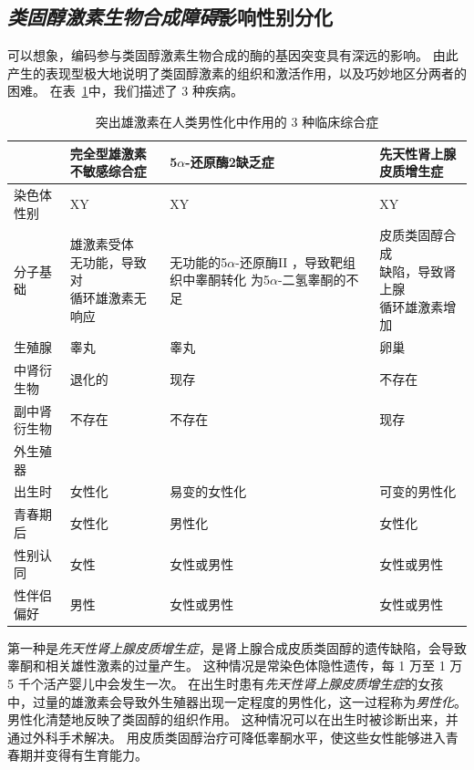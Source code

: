 \subsection{\textit{类固醇激素生物合成障碍}影响性别分化}

可以想象，编码参与类固醇激素生物合成的酶的基因突变具有深远的影响。
由此产生的表现型极大地说明了类固醇激素的组织和激活作用，以及巧妙地区分两者的困难。
在表~\ref{tab:51_1}中，我们描述了 3 种疾病。


\begin{table}[htbp]
	\caption{突出雄激素在人类男性化中作用的 3 种临床综合症} \label{tab:51_1} \centering
	\begin{tabular}{llll}
		\toprule
		 & 完全型雄激素不敏感综合症 & 5$\alpha$-还原酶2缺乏症 & 先天性肾上腺皮质增生症\\
		\midrule
		染色体性别 & XY & XY & XY \\
		分子基础 & \makecell[l]{雄激素受体\\无功能，导致对\\循环雄激素无响应} & \makecell[l]{无功能的5$\alpha$-还原酶II\\，导致靶组织中睾酮转化\\为5$\alpha$-二氢睾酮的不足} & \makecell[l]{皮质类固醇合成\\缺陷，导致肾上腺\\循环雄激素增加} \\
		生殖腺 & 睾丸 & 睾丸 & 卵巢 \\
		中肾衍生物 & 退化的 & 现存 & 不存在 \\
		副中肾衍生物 & 不存在 & 不存在 & 现存 \\
		外生殖器 &  &  &  \\
		出生时 & 女性化 & 易变的女性化 & 可变的男性化 \\
		青春期后 & 女性化 & 男性化 & 女性化 \\
		性别认同 & 女性 & 女性或男性 & 女性或男性 \\
		性伴侣偏好 & 男性 & 女性或男性 & 女性或男性 \\
		\bottomrule
	\end{tabular}
\end{table}


第一种是\textit{先天性肾上腺皮质增生症}，是肾上腺合成皮质类固醇的遗传缺陷，会导致睾酮和相关雄性激素的过量产生。
这种情况是常染色体隐性遗传，每 1 万至 1 万 5 千个活产婴儿中会发生一次。
在出生时患有\textit{先天性肾上腺皮质增生症}的女孩中，过量的雄激素会导致外生殖器出现一定程度的男性化，这一过程称为\textit{男性化}。
男性化清楚地反映了类固醇的组织作用。
这种情况可以在出生时被诊断出来，并通过外科手术解决。
用皮质类固醇治疗可降低睾酮水平，使这些女性能够进入青春期并变得有生育能力。


